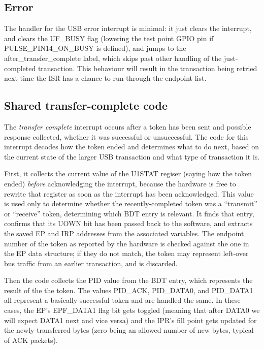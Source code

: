 \subsection{Error}

The handler for the USB error interrupt is minimal:  it just clears the
interrupt, and clears the UF\_BUSY flag (lowering the test point GPIO pin if
PULSE\_PIN14\_ON\_BUSY is defined), and jumps to the
after\_transfer\_complete label, which skips past other handling of the
just-completed transaction.  This behaviour will result in the transaction
being retried next time the ISR has a chance to run through the endpoint
list.

\subsection{Shared transfer-complete code}

The \emph{transfer complete} interrupt occurs after a token has been sent
and possible response collected, whether it was successful or unsuccessful. 
The code for this interrupt decodes how the token ended and determines what
to do next, based on the current state of the larger USB transaction and
what type of transaction it is.

First, it collects the current value of the U1STAT regiser (saying how the
token ended) \emph{before} acknowledging the interrupt, because the hardware
is free to rewrite that register as soon as the interrupt has been
acknowledged.  This value is used only to determine whether the
recently-completed token was a ``transmit'' or ``receive'' token,
determining which BDT entry is relevant.  It finds that entry, confirms that
its UOWN bit has been passed back to the software, and extracts the saved EP
and IRP addresses from the associated variables.  The endpoint number of the
token as reported by the hardware is checked against the one in the EP data
structure; if they do not match, the token may represent left-over bus
traffic from an earlier transaction, and is discarded.

Then the code collects the PID value from the BDT entry, which represents
the result of the the token.  The values PID\_ACK, PID\_DATA0, and
PID\_DATA1 all represent a basically successful token and are handled the
same.  In these cases, the EP's EPF\_DATA1 flag bit gets toggled
(meaning that after DATA0 we will expect DATA1 next and vice versa) and the
IPR's fill point gets updated for the newly-transferred bytes (zero being an
allowed number of new bytes, typical of ACK packets).

